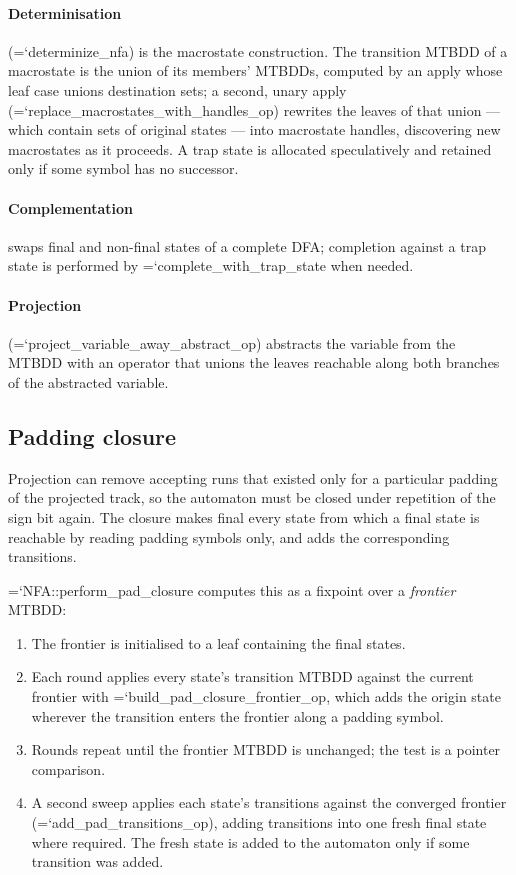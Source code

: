 \documentclass[10pt,a4paper]{article}
\newcommand{\code}[1]{{\small\ttfamily\hyphenchar\font=`\-\relax #1}}
\begin{document}
\paragraph{Determinisation} (\code{determinize\_nfa}) is the macrostate construction.  The transition
MTBDD of a macrostate is the union of its members' MTBDDs, computed by an apply whose leaf case unions
destination sets; a second, unary apply (\code{replace\_\allowbreak macrostates\_\allowbreak with\_\allowbreak handles\_\allowbreak op}) rewrites the
leaves of that union --- which contain sets of original states --- into macrostate handles, discovering
new macrostates as it proceeds.  A trap state is allocated speculatively and retained only if some
symbol has no successor.

\paragraph{Complementation} swaps final and non-final states of a complete DFA; completion against a
trap state is performed by \code{complete\_with\_trap\_state} when needed.

\paragraph{Projection} (\code{project\_\allowbreak variable\_\allowbreak away\_\allowbreak abstract\_\allowbreak op}) abstracts the variable from the
MTBDD with an operator that unions the leaves reachable along both branches of the abstracted variable.

\subsection{Padding closure}
\label{sec:padclosure}

Projection can remove accepting runs that existed only for a particular padding of the projected
track, so the automaton must be closed under repetition of the sign bit again.  The closure makes final
every state from which a final state is reachable by reading padding symbols only, and adds the
corresponding transitions.

\code{NFA::perform\_pad\_closure} computes this as a fixpoint over a \emph{frontier} MTBDD:

\begin{enumerate}
  \item The frontier is initialised to a leaf containing the final states.
  \item Each round applies every state's transition MTBDD against the current frontier with
        \code{build\_pad\_closure\_frontier\_op}, which adds the origin state wherever the transition
        enters the frontier along a padding symbol.
  \item Rounds repeat until the frontier MTBDD is unchanged; the test is a pointer comparison.
  \item A second sweep applies each state's transitions against the converged frontier
        (\code{add\_pad\_transitions\_op}), adding transitions into one fresh final state where
        required.  The fresh state is added to the automaton only if some transition was added.
\end{enumerate}
\end{document}
